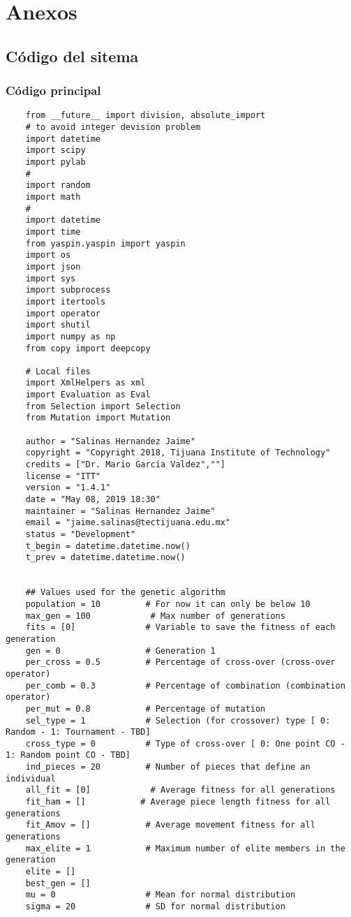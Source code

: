\chapter{Anexos} 

\section{Código del sitema}
\label{app:code}

\subsection{Código principal}
\label{code:code_main}
    
    \begin{verbatim}
    from __future__ import division, absolute_import                 
    # to avoid integer devision problem
    import datetime 
    import scipy
    import pylab
    #
    import random
    import math
    #
    import datetime
    import time
    from yaspin.yaspin import yaspin
    import os
    import json
    import sys
    import subprocess
    import itertools
    import operator
    import shutil
    import numpy as np
    from copy import deepcopy

    # Local files
    import XmlHelpers as xml
    import Evaluation as Eval 
    from Selection import Selection
    from Mutation import Mutation

    author = "Salinas Hernandez Jaime"
    copyright = "Copyright 2018, Tijuana Institute of Technology"
    credits = ["Dr. Mario García Valdez",""]
    license = "ITT"
    version = "1.4.1"
    date = "May 08, 2019 18:30"
    maintainer = "Salinas Hernandez Jaime"
    email = "jaime.salinas@tectijuana.edu.mx"
    status = "Development"
    t_begin = datetime.datetime.now()
    t_prev = datetime.datetime.now()


    ## Values used for the genetic algorithm
    population = 10         # For now it can only be below 10
    max_gen = 100            # Max number of generations
    fits = [0]              # Variable to save the fitness of each generation
    gen = 0                 # Generation 1
    per_cross = 0.5         # Percentage of cross-over (cross-over operator)
    per_comb = 0.3          # Percentage of combination (combination operator)
    per_mut = 0.8           # Percentage of mutation
    sel_type = 1            # Selection (for crossover) type [ 0: Random - 1: Tournament - TBD]
    cross_type = 0          # Type of cross-over [ 0: One point CO - 1: Random point CO - TBD]
    ind_pieces = 20         # Number of pieces that define an individual
    all_fit = [0]            # Average fitness for all generations
    fit_ham = []           # Average piece length fitness for all generations
    fit_Amov = []           # Average movement fitness for all generations
    max_elite = 1           # Maximum number of elite members in the generation
    elite = []
    best_gen = []
    mu = 0                  # Mean for normal distribution
    sigma = 20              # SD for normal distribution


\end{verbatim}
